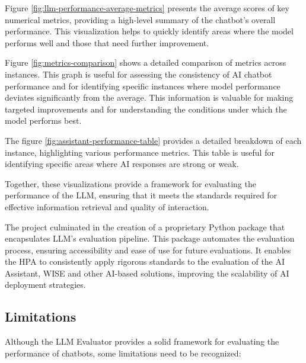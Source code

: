 Figure \ref{fig:llm-performance-average-metrics} presents the average scores of key numerical metrics, providing a high-level summary of the chatbot's overall performance. This visualization helps to quickly identify areas where the model performs well and those that need further improvement.

Figure \ref{fig:metrics-comparison} shows a detailed comparison of metrics across instances. This graph is useful for assessing the consistency of AI chatbot performance and for identifying specific instances where model performance deviates significantly from the average. This information is valuable for making targeted improvements and for understanding the conditions under which the model performs best.

The figure \ref{fig:assistant-performance-table} provides a detailed breakdown of each instance, highlighting various performance metrics. This table is useful for identifying specific areas where AI responses are strong or weak.

Together, these visualizations provide a framework for evaluating the performance of the LLM, ensuring that it meets the standards required for effective information retrieval and quality of interaction.

The project culminated in the creation of a proprietary Python package that encapsulates LLM's evaluation pipeline. This package automates the evaluation process, ensuring accessibility and ease of use for future evaluations. It enables the HPA to consistently apply rigorous standards to the evaluation of the AI Assistant, WISE and other AI-based solutions, improving the scalability of AI deployment strategies.

\subsection{Limitations}

Although the LLM Evaluator provides a solid framework for evaluating the performance of chatbots, some limitations need to be recognized:

